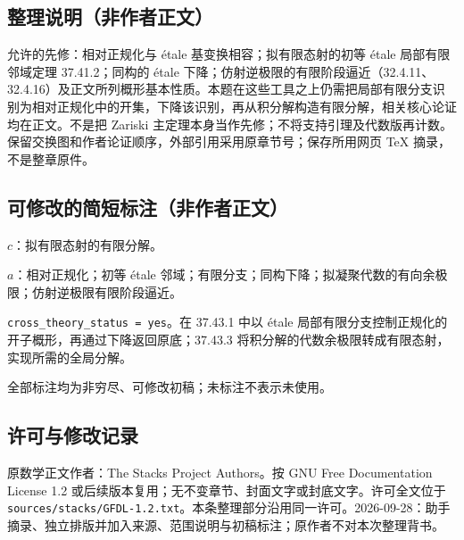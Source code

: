\documentclass[UTF8,11pt]{ctexart}
\theoremstyle{definition}
\begin{document}
\subsection*{整理说明（非作者正文）}
允许的先修：相对正规化与 étale 基变换相容；拟有限态射的初等 étale 局部有限邻域定理 37.41.2；同构的 étale 下降；仿射逆极限的有限阶段逼近（32.4.11、32.4.16）及正文所列概形基本性质。本题在这些工具之上仍需把局部有限分支识别为相对正规化中的开集，下降该识别，再从积分解构造有限分解，相关核心论证均在正文。不是把 Zariski 主定理本身当作先修；不将支持引理及代数版再计数。保留交换图和作者论证顺序，外部引用采用原章节号；保存所用网页 TeX 摘录，不是整章原件。
\subsection*{可修改的简短标注（非作者正文）}
$c$：拟有限态射的有限分解。

$a$：相对正规化；初等 étale 邻域；有限分支；同构下降；拟凝聚代数的有向余极限；仿射逆极限有限阶段逼近。

\texttt{cross\_theory\_status = yes}。在 37.43.1 中以 étale 局部有限分支控制正规化的开子概形，再通过下降返回原底；37.43.3 将积分解的代数余极限转成有限态射，实现所需的全局分解。

全部标注均为非穷尽、可修改初稿；未标注不表示未使用。
\subsection*{许可与修改记录}
原数学正文作者：The Stacks Project Authors。按 GNU Free Documentation License 1.2 或后续版本复用；无不变章节、封面文字或封底文字。许可全文位于 \texttt{sources/stacks/GFDL-1.2.txt}。本条整理部分沿用同一许可。2026-09-28：助手摘录、独立排版并加入来源、范围说明与初稿标注；原作者不对本次整理背书。
\end{document}
